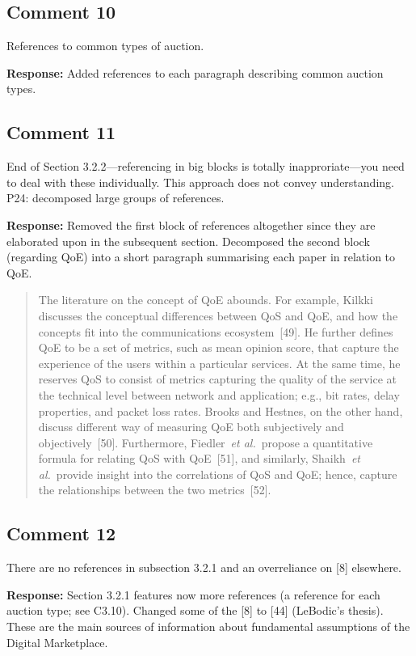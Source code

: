\documentclass[10pt,a4paper,notitlepage]{article}
\numberwithin{equation}{section}
\begin{document}
\subsection{Comment 10}
References to common types of auction.

\textbf{Response:}
Added references to each paragraph describing common auction types.

\subsection{Comment 11}
End of Section 3.2.2---referencing in big blocks is totally inapproriate---you need to deal with these individually. This approach does not convey understanding. P24: decomposed large groups of references.

\textbf{Response:}
Removed the first block of references altogether since they are elaborated upon in the subsequent section. Decomposed the second block (regarding QoE) into a short paragraph summarising each paper in relation to QoE.
\begin{quote}
The literature on the concept of QoE abounds. For example, Kilkki discusses the conceptual differences between QoS and QoE, and how the concepts fit into the communications ecosystem~[49]. He further defines QoE to be a set of metrics, such as mean opinion score, that capture the experience of the users within a particular services. At the same time, he reserves QoS to consist of metrics capturing the quality of the service at the technical level between network and application; e.g., bit rates, delay properties, and packet loss rates. Brooks and Hestnes, on the other hand, discuss different way of measuring QoE both subjectively and objectively~[50]. Furthermore, Fiedler~\emph{et al.}~propose a quantitative formula for relating QoS with QoE~[51], and similarly, Shaikh~\emph{et al.}~provide insight into the correlations of QoS and QoE; hence, capture the relationships between the two metrics~[52].
\end{quote}

\subsection{Comment 12}
There are no references in subsection 3.2.1 and an overreliance on [8] elsewhere.

\textbf{Response:}
Section 3.2.1 features now more references (a reference for each auction type; see C3.10). Changed some of the [8] to [44] (LeBodic's thesis). These are the main sources of information about fundamental assumptions of the Digital Marketplace.
\end{document}
